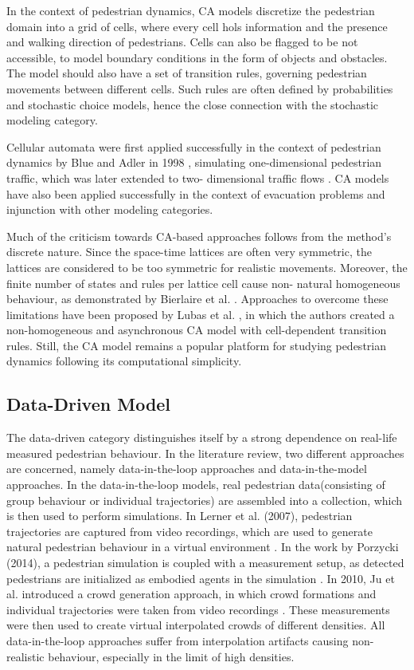 \documentclass[class=article, crop=false]{standalone}
\begin{document}
In the context of pedestrian dynamics, CA models discretize the pedestrian domain into a grid of cells, where every cell hols information and the presence and walking direction of pedestrians. Cells can also be flagged to be not accessible, to model boundary conditions in the form of objects and obstacles. The model should also have a set of transition rules, governing pedestrian movements between different cells. Such rules are often defined by probabilities and stochastic choice models, hence the close connection with the stochastic modeling category.

Cellular automata were first applied successfully in the context of pedestrian dynamics by Blue and Adler in 1998 \cite{microsimulation_1}, simulating one-dimensional pedestrian traffic, which was later extended to two- dimensional traffic flows \cite{microsimulation_2}. CA models have also been applied successfully in the context of evacuation problems \cite{evacuation_1,evacuation_2} and injunction with other modeling categories.

Much of the criticism towards CA-based approaches follows from the method’s discrete nature. Since the space-time lattices are often very symmetric, the lattices are considered to be too symmetric for realistic movements. Moreover, the finite number of states and rules per lattice cell cause non- natural homogeneous behaviour, as demonstrated by Bierlaire et al. \cite{criticism_1}. Approaches to overcome these limitations have been proposed by Lubas et al. \cite{criticism_2}, in which the authors created a non-homogeneous and asynchronous CA model with cell-dependent transition rules. Still, the CA model remains a popular platform for studying pedestrian dynamics following its computational simplicity.


\subsection{Data-Driven Model}
The data-driven category distinguishes itself by a strong dependence on real-life measured pedestrian behaviour. In the literature review, two different approaches are concerned, namely data-in-the-loop approaches and data-in-the-model approaches.
In the data-in-the-loop models, real pedestrian data(consisting of group behaviour or individual trajectories) are assembled into a collection, which is then used to perform simulations. 
In Lerner et al. (2007), pedestrian trajectories are captured from video recordings, which are used to generate natural pedestrian behaviour in a virtual environment \cite{crowds}. 
In the work by Porzycki (2014), a pedestrian simulation is coupled with a measurement setup, as detected pedestrians are initialized as embodied agents in the simulation \cite{data_driven}. 
In 2010, Ju et al. introduced a crowd generation approach, in which crowd formations and individual trajectories were taken from video recordings \cite{mor_crowds}. 
These measurements were then used to create virtual interpolated crowds of different densities. 
All data-in-the-loop approaches suffer from interpolation artifacts causing non-realistic behaviour, especially in the limit of high densities.
\end{document}
